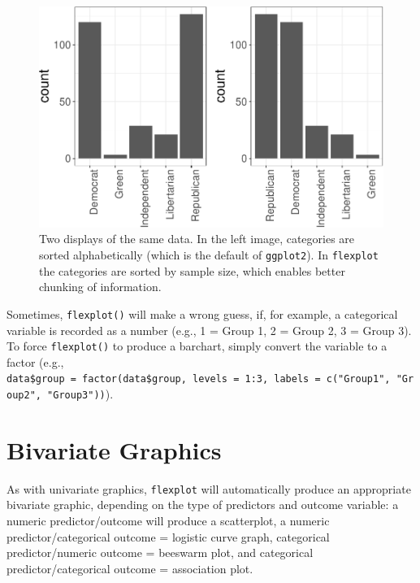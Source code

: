 \documentclass[
  doc]{apa6}
\begin{document}
\begin{figure}
\centering
\includegraphics{flexplot_psychmeth_files/figure-latex/chunkit-1.pdf}
\caption{\label{fig:chunkit}Two displays of the same data. In the left image, categories are sorted alphabetically (which is the default of \texttt{ggplot2}). In \texttt{flexplot} the categories are sorted by sample size, which enables better chunking of information. \label{fig:chunkit}}
\end{figure}

Sometimes, \texttt{flexplot()} will make a wrong guess, if, for example, a categorical variable is recorded as a number (e.g., 1 = Group 1, 2 = Group 2, 3 = Group 3). To force \texttt{flexplot()} to produce a barchart, simply convert the variable to a factor (e.g., \texttt{data\$group\ =\ factor(data\$group,\ levels\ =\ 1:3,\ labels\ =\ c("Group1",\ "Group2",\ "Group3"))}).

\hypertarget{bivariate-graphics}{%
\section{Bivariate Graphics}\label{bivariate-graphics}}

As with univariate graphics, \texttt{flexplot} will automatically produce an appropriate bivariate graphic, depending on the type of predictors and outcome variable: a numeric predictor/outcome will produce a scatterplot, a numeric predictor/categorical outcome = logistic curve graph, categorical predictor/numeric outcome = beeswarm plot, and categorical predictor/categorical outcome = association plot.
\end{document}
